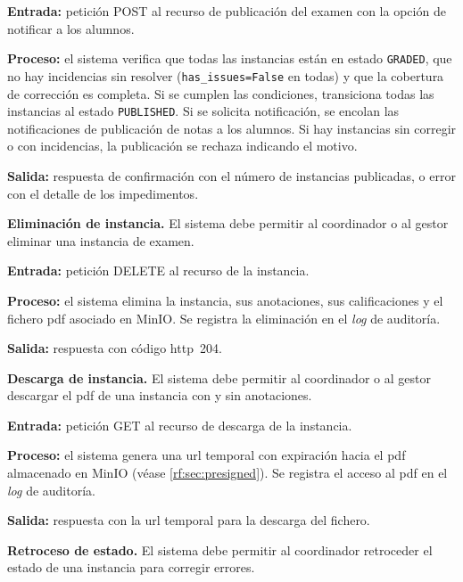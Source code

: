\begin{functional}
    \textbf{Entrada:} petición POST al recurso de publicación del examen con la opción de
    notificar a los alumnos.

    \textbf{Proceso:} el sistema verifica que todas las instancias están en estado
    \texttt{GRADED}, que no hay incidencias sin resolver (\texttt{has\_issues=False} en
    todas) y que la cobertura de corrección es completa. Si se cumplen las condiciones,
    transiciona todas las instancias al estado \texttt{PUBLISHED}. Si se solicita
    notificación, se encolan las notificaciones de publicación de notas a los alumnos. Si
    hay instancias sin corregir o con incidencias, la publicación se rechaza indicando el
    motivo.

    \textbf{Salida:} respuesta de confirmación con el número de instancias publicadas, o
    error con el detalle de los impedimentos.

    \item \textbf{Eliminación de instancia.} \label{rf:instances:delete}
    El sistema debe permitir al coordinador o al gestor eliminar una instancia de examen.

    \textbf{Entrada:} petición DELETE al recurso de la instancia.

    \textbf{Proceso:} el sistema elimina la instancia, sus anotaciones, sus calificaciones
    y el fichero \acs{pdf} asociado en MinIO. Se registra la eliminación en el \textit{log}
    de auditoría.

    \textbf{Salida:} respuesta con código \acs{http}~204.

    \item \textbf{Descarga de instancia.} \label{rf:instances:download}
    El sistema debe permitir al coordinador o al gestor descargar el \acs{pdf} de una
    instancia con y sin anotaciones.

    \textbf{Entrada:} petición GET al recurso de descarga de la instancia.

    \textbf{Proceso:} el sistema genera una \acs{url} temporal con expiración hacia el
    \acs{pdf} almacenado en MinIO (véase \cref{rf:sec:presigned}). Se registra el acceso
    al \acs{pdf} en el \textit{log} de auditoría.

    \textbf{Salida:} respuesta con la \acs{url} temporal para la descarga del fichero.

    \item \textbf{Retroceso de estado.} \label{rf:instances:rollback}
    El sistema debe permitir al coordinador retroceder el estado de una instancia para
    corregir errores.


\end{functional}
